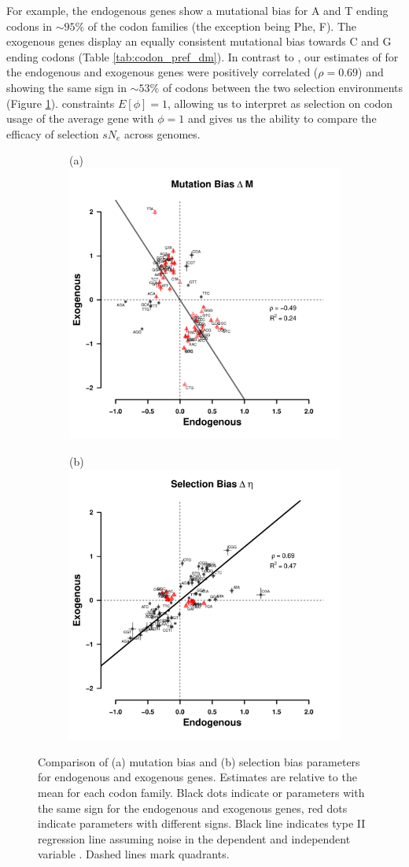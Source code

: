 \documentclass[fleqn,letterpaper]{article}
\begin{document}
For example, the endogenous genes show a mutational bias for A and T ending codons in $\sim95\%$ of the codon families (the exception being Phe, F).
The exogenous genes display an equally consistent mutational bias towards C and G ending codons (Table \ref{tab:codon_pref_dm}).
In contrast to \DM, our estimates of \DE for the endogenous and exogenous genes were positively correlated ($\rho = 0.69$) and showing the same sign in $\sim53\%$ of codons between the two selection environments (Figure \ref{fig:csp_comp}).
\ROC constraints $E[\phi] = 1$, allowing us to interpret \DE as selection on codon usage of the average gene with $\phi = 1$ and gives us the ability to compare the efficacy of selection $sN_e$  across genomes.

\begin{figure}
    \centering
    \begin{subfigure}
        \centering
        (a) \includegraphics[width=.45\textwidth]{img/csp_corr_dm.pdf}
    \end{subfigure}
    \begin{subfigure}
        \centering
        (b) \includegraphics[width=.45\textwidth]{img/csp_corr_deta.pdf}
    \end{subfigure}
    \caption{Comparison of (a) mutation bias \DM and (b) selection bias \DE parameters for endogenous and exogenous genes.
      Estimates are relative to the mean for each codon family.
      Black dots indicate \DM or \DE parameters with the same sign for the endogenous and exogenous genes, red dots indicate parameters with different signs.
      Black line indicates type II regression line assuming noise in the dependent and independent variable \citep{SokalAndRohlf1981}.
      Dashed lines mark quadrants.}
    \label{fig:csp_comp}
\end{figure}
\end{document}
